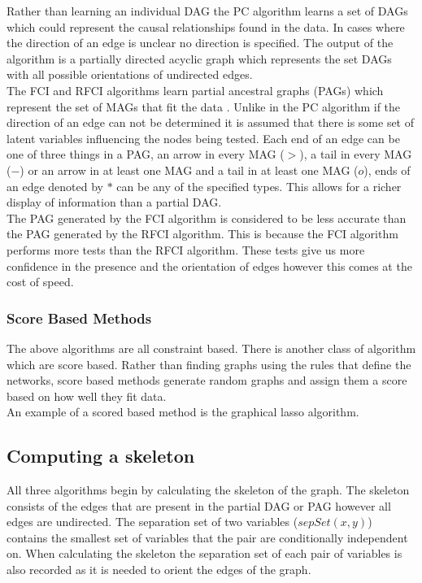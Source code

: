 \documentclass{article}
\begin{document}
Rather than learning an individual DAG the PC algorithm learns a set of DAGs which could represent the causal relationships found in the data. In cases where the direction of an edge is unclear no direction is specified. The output of the algorithm is a partially directed acyclic graph which represents the set DAGs with all possible orientations of undirected edges\cite{spirtes1991algorithm}.
\\

The FCI and RFCI algorithms learn partial ancestral graphs (PAGs) which represent the set of MAGs that fit the data \cite{colombo2012learning}. Unlike in the PC algorithm if the direction of an edge can not be determined it is assumed that there is some set of latent variables influencing the nodes being tested. Each end of an edge can be one of three things in a PAG, an arrow in every MAG ($>$), a tail in every MAG ($-$) or an arrow in at least one MAG and a tail in at least one MAG ($o$), ends of an edge denoted by $*$ can be any of the specified types. This allows for a richer display of information than a partial DAG\cite{colombo2012learning}.
\\

The PAG generated by the FCI algorithm is considered to be less accurate than the PAG generated by the RFCI algorithm. This is because the FCI algorithm performs more tests than the RFCI algorithm. These tests give us more confidence in the presence and the orientation of edges however this comes at the cost of speed.
\\
\subsubsection{Score Based Methods}
The above algorithms are all constraint based. There is another class of algorithm which are score based. Rather than finding graphs using the rules that define the networks, score based methods generate random graphs and assign them a score based on how well they fit data.\\

An example of a scored based method is the graphical lasso algorithm. 

\subsection{Computing a skeleton}
All three algorithms begin by calculating the skeleton of the graph. The skeleton consists of the edges that are present in the partial DAG or PAG however all edges are undirected. The separation set of two variables ($sepSet(x,y)$) contains the smallest set of variables that the pair are conditionally independent on.  When calculating the skeleton the separation set of each pair of variables is also recorded as it is needed to orient the edges of the graph\cite{colombo2012learning, spirtes1991algorithm}.
\\
\end{document}
